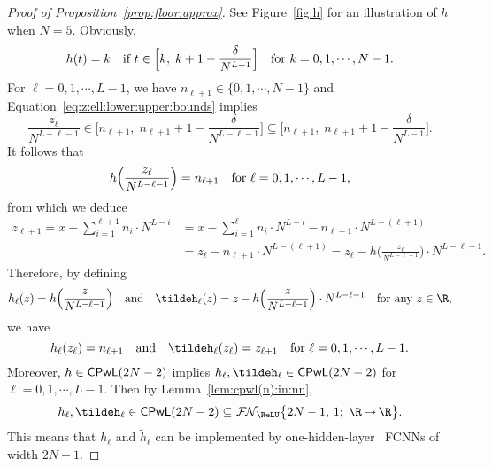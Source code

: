 \documentclass[11pt,a4paper]{article}
\begin{document}
\begin{proof}[Proof of Proposition~\ref{prop:floor:approx}]
See Figure~\ref{fig:h} for an illustration of $h$ when $N=5$.
Obviously, 
\begin{equation*}
    h(t)=k\quad \textnormal{if $t\in \Big[k,\; k+1-\frac{\delta}{N^{L-1}}\Big]$}\quad \textnormal{for $k=0,1,\mathinner{\mkern-0.1mu\cdotp\mkern-0.3mu\cdotp\mkern-0.3mu\cdotp\mkern-0.1mu},N-1$.}
\end{equation*}
For $\ell=0,1,\cdots,L-1$, we have $n_{\ell+1}\in \{0,1,\cdots,N-1\}$ and Equation~\eqref{eq:z:ell:lower:upper:bounds} implies 
\begin{equation*}
     \frac{z_\ell}{N^{L-\ell-1}}\in
     \Big[n_{\ell+1},\; n_{\ell+1}+1 -\frac{\delta}{N^{L-\ell-1}}\Big]
     \subseteq 
     \Big[n_{\ell+1},\; n_{\ell+1}+1 -\frac{\delta}{N^{L-1}}\Big].
\end{equation*}
It follows that 
\begin{equation*}
    h\Big(\frac{z_\ell}{N^{L-\ell-1}}\Big)= n_{\ell+1}\quad \textnormal{for $\ell=0,1,\mathinner{\mkern-0.1mu\cdotp\mkern-0.3mu\cdotp\mkern-0.3mu\cdotp\mkern-0.1mu},L-1$,}
\end{equation*}
from which we deduce
\begin{equation*}
    \begin{split}
        z_{\ell+1} = x- \sum_{i=1}^{\ell+1}
    n_i\cdot N^{L-i}
    &= x- \sum_{i=1}^{\ell}
    n_i\cdot N^{L-i}-n_{\ell+1} \cdot N^{L-(\ell+1)}
    \\& = z_\ell - n_{\ell+1} \cdot N^{L-(\ell+1)}
    = z_\ell - h\Big(\frac{z_\ell}{N^{L-\ell-1}}\Big) \cdot N^{L-\ell-1}.   
    \end{split}
\end{equation*}
Therefore, by defining 
\begin{equation*}
    h_\ell(z) =  h\Big(\frac{z}{N^{L-\ell-1}}\Big)\quad \tn{and}\quad 
    \tildeh_\ell(z) =  z- h\Big(\frac{z}{N^{L-\ell-1}}\Big)\cdot N^{L-\ell-1}\quad \tn{for any $z\in\R$,}
\end{equation*}
we have 
\begin{equation}
\label{eq:z:ell:to:n:z:ell+1}
    h_\ell(z_\ell) = n_{\ell+1}\quad \tn{and}\quad 
    \tildeh_\ell(z_\ell) =  z_{\ell+1}\quad \tn{for $\ell=0,1,\cdots,L-1$.}
\end{equation}
Moreover, $h\in \textsf{\textup{CPwL}}(2N-2)$ implies
$h_\ell,\tildeh_\ell \in \cpwl(2N-2)$
for $\ell=0,1,\cdots,L-1$. Then by Lemma~\ref{lem:cpwl(n):in:nn}, 
\begin{equation}\label{eq:h:ell:tildeh:ell:in:NN}
    h_\ell,\tildeh_\ell \in \cpwl(2N-2)\subseteq \nn[\big]{\ReLU}{2N-1}{1}{\R}{\R}.
\end{equation}
This means that \( h_\ell \) and \( \tilde{h}_\ell \) can be implemented by one-hidden-layer \ReLU\ FCNNs of width \( 2N-1 \).


\end{proof}
\end{document}
